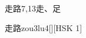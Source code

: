 \begin{entry}{走路}{7,13}{⾛、⾜}
  \begin{phonetics}{走路}{zou3lu4}[][HSK 1]
  \end{phonetics}
\end{entry}

